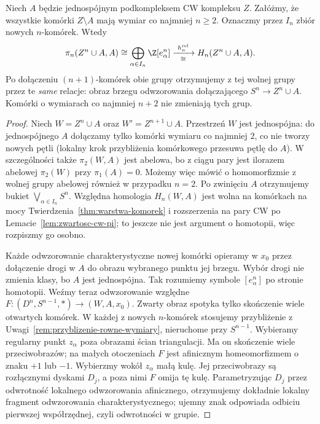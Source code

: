 \begin{lemat}
\label{lem:pierwsze-komorki-pi}
Niech $A$ będzie jednospójnym
podkompleksem CW kompleksu $Z$.
Załóżmy, że wszystkie komórki
$Z\setminus A$ mają wymiar
co najmniej $n\geq2$.
Oznaczmy przez $I_n$
zbiór nowych $n$-komórek.
Wtedy
\[
 \pi_n(Z^n\cup A,A)
 \cong\bigoplus_{\alpha\in I_n}\Z[e_\alpha^n]
 \xrightarrow[\cong]{\ h_n^{\mathrm{rel}}\ }
 H_n(Z^n\cup A,A).
\]
Po dołączeniu $(n+1)$-komórek
obie grupy otrzymujemy
z tej wolnej grupy przez
te \emph{same} relacje:
obraz brzegu odwzorowania
dołączającego $S^n\to
Z^n\cup A$. Komórki
o wymiarach co najmniej
$n+2$ nie zmieniają
tych grup.
\end{lemat}
\begin{proof}
Niech $W=Z^n\cup A$ oraz $W'=Z^{n+1}\cup A$.
Przestrzeń $W$ jest jednospójna: do jednospójnego $A$
dołączamy tylko komórki wymiaru co najmniej $2$, co nie tworzy
nowych pętli (lokalny krok przybliżenia komórkowego przesuwa pętlę do $A$).
W szczególności także $\pi_2(W,A)$ jest abelowa, bo z ciągu pary
jest ilorazem abelowej $\pi_2(W)$ przy $\pi_1(A)=0$.
Możemy więc mówić o homomorfizmie z wolnej grupy abelowej
również w przypadku $n=2$.
Po zwinięciu $A$
otrzymujemy bukiet
$\bigvee_{\alpha\in I_n}S^n$.
Względna homologia
$H_n(W,A)$ jest
wolna na komórkach
na mocy
Twierdzenia~\ref{thm:warstwa-komorek}
i rozszerzenia na pary CW po Lemacie~\ref{lem:zwartosc-cw-pi};
to jeszcze nie jest
argument o homotopii,
więc rozpiszmy go
osobno.

Każde odwzorowanie charakterystyczne nowej komórki opieramy w $x_0$
przez dołączenie drogi w $A$ do obrazu wybranego punktu jej brzegu.
Wybór drogi nie zmienia klasy, bo $A$ jest jednospójna.
Tak rozumiemy symbole $[e_\alpha^n]$ po stronie homotopii.
Weźmy teraz odwzorowanie względne
$F:(D^n,S^{n-1},*)\to(W,A,x_0)$.
Zwarty obraz spotyka
tylko skończenie wiele
otwartych komórek.
W każdej z nowych $n$-komórek stosujemy przybliżenie
z Uwagi~\ref{rem:przyblizenie-rowne-wymiary}, nieruchome przy $S^{n-1}$.
Wybieramy regularny punkt $z_\alpha$ poza obrazami ścian triangulacji.
Ma on skończenie wiele przeciwobrazów; na małych otoczeniach
$F$ jest afinicznym homeomorfizmem o znaku $+1$ lub $-1$.
Wybierzmy wokół $z_\alpha$ małą kulę. Jej przeciwobrazy są rozłącznymi
dyskami $D_j$, a poza nimi $F$ omija tę kulę.
Parametryzując $D_j$ przez odwrotność lokalnego odwzorowania afinicznego,
otrzymujemy dokładnie lokalny fragment odwzorowania charakterystycznego;
ujemny znak odpowiada odbiciu pierwszej współrzędnej, czyli odwrotności w grupie.


\end{proof}

